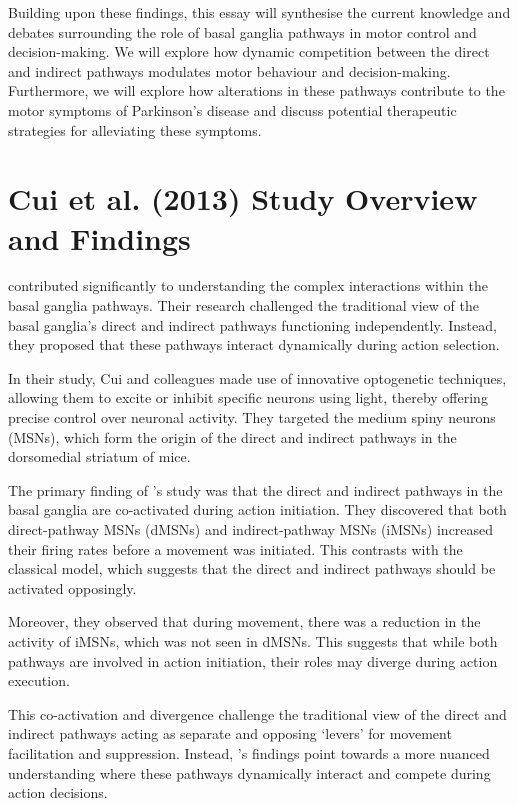 \documentclass[10pt]{article}
\begin{document}
\begin{sloppypar}
  Building upon these findings, this essay will synthesise the current knowledge and debates surrounding the role of basal ganglia pathways in motor control and decision-making. We will explore how dynamic competition between the direct and indirect pathways modulates motor behaviour and decision-making. Furthermore, we will explore how alterations in these pathways contribute to the motor symptoms of Parkinson’s disease and discuss potential therapeutic strategies for alleviating these symptoms.

  \section{Cui et al. (2013) Study Overview and Findings}
  \label{sec:cui-et-al-2013}

  \cite{cui_concurrent_2013} contributed significantly to understanding the complex interactions within the basal ganglia pathways. Their research challenged the traditional view of the basal ganglia’s direct and indirect pathways functioning independently. Instead, they proposed that these pathways interact dynamically during action selection.

  In their study, Cui and colleagues made use of innovative optogenetic techniques, allowing them to excite or inhibit specific neurons using light, thereby offering precise control over neuronal activity. They targeted the medium spiny neurons (MSNs), which form the origin of the direct and indirect pathways in the dorsomedial striatum of mice.

  The primary finding of \citeauthor{cui_concurrent_2013} ’s study was that the direct and indirect pathways in the basal ganglia are co-activated during action initiation. They discovered that both direct-pathway MSNs (dMSNs) and indirect-pathway MSNs (iMSNs) increased their firing rates before a movement was initiated. This contrasts with the classical model, which suggests that the direct and indirect pathways should be activated opposingly.

  Moreover, they observed that during movement, there was a reduction in the activity of iMSNs, which was not seen in dMSNs. This suggests that while both pathways are involved in action initiation, their roles may diverge during action execution.

  This co-activation and divergence challenge the traditional view of the direct and indirect pathways acting as separate and opposing ‘levers’ for movement facilitation and suppression. Instead, \citeauthor{cui_concurrent_2013} ’s findings point towards a more nuanced understanding where these pathways dynamically interact and compete during action decisions.


\end{sloppypar}
\end{document}
